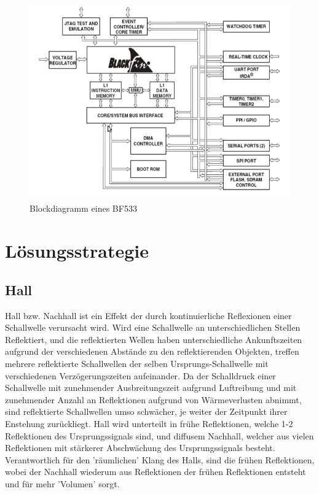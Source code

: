 \documentclass[a4paper,12pt,fontsize=12,DIV=12]{scrartcl}
\begin{document}
\begin{figure}[h]
	\includegraphics[scale=0.5]{Bilder/bf533block.png}
	\caption{Blockdiagramm eines BF533}
	\label{labelname}
\end{figure}

\section{Lösungsstrategie}
\subsection{Hall}
Hall bzw. Nachhall ist ein Effekt der durch kontinuierliche Reflexionen einer Schallwelle verursacht wird.
Wird eine Schallwelle an unterschiedlichen Stellen Reflektiert, und die reflektierten Wellen haben unterschiedliche Ankunftszeiten aufgrund der verschiedenen Abstände zu den reflektierenden Objekten, treffen mehrere reflektierte Schallwellen der selben Ursprungs-Schallwelle mit verschiedenen Verzögerungszeiten aufeinander. Da der Schalldruck einer Schallwelle mit zunehmender Ausbreitungszeit aufgrund Luftreibung und mit zunehmender Anzahl an Reflektionen aufgrund von Wärmeverlusten abnimmt, sind reflektierte Schallwellen umso schwächer, je weiter der Zeitpunkt ihrer Enstehung zurückliegt.
Hall wird unterteilt in frühe Reflektionen, welche 1-2 Reflektionen des Ursprungssignals sind, und diffusem Nachhall, welcher aus vielen Reflektionen mit stärkerer Abschwächung des Ursprungssignals besteht. Verantwortlich für den 'räumlichen' Klang des Halls, sind die frühen Reflektionen, wobei der Nachhall wiederum aus Reflektionen der frühen Reflektionen entsteht und für mehr 'Volumen' sorgt.
\end{document}
